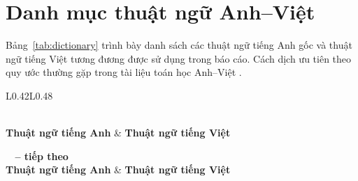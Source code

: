 \section*{Danh mục thuật ngữ Anh--Việt}
{}
\label{sec:dictionary}

Bảng~\ref{tab:dictionary} trình bày danh sách các thuật ngữ tiếng Anh gốc và thuật ngữ tiếng Việt tương đương được sử dụng trong báo cáo. Cách dịch ưu tiên theo quy ước thường gặp trong tài liệu toán học Anh--Việt \cite{hoangtuy1976}. 

\begin{longtable}{L{0.42\textwidth}L{0.48\textwidth}}
\caption{Danh mục thuật ngữ đối chiếu Anh--Việt}
\label{tab:dictionary} \\
\toprule
\textbf{Thuật ngữ tiếng Anh} & \textbf{Thuật ngữ tiếng Việt} \\
\midrule
\endfirsthead

%
{{\bfseries \tablename\ \thetable{} -- tiếp theo}} \\
\toprule
\textbf{Thuật ngữ tiếng Anh} & \textbf{Thuật ngữ tiếng Việt} \\
\midrule
\endhead

\midrule
{} \\
\endfoot

\bottomrule
\endlastfoot


\end{longtable}
